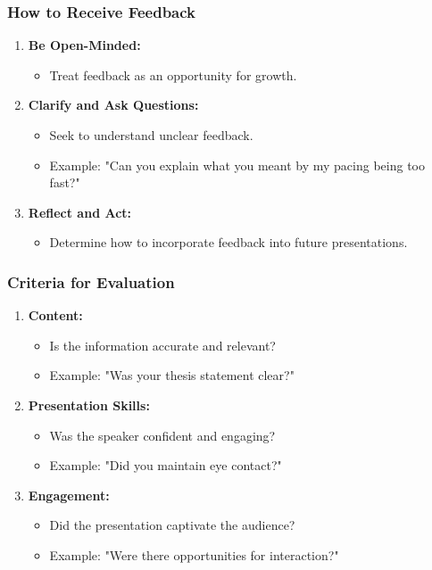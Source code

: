 \documentclass[aspectratio=169]{beamer}
\begin{document}
\begin{frame}[fragile]
  \frametitle{How to Receive Feedback}
  \begin{enumerate}
    \item \textbf{Be Open-Minded:} 
      \begin{itemize}
        \item Treat feedback as an opportunity for growth.
      \end{itemize}
    \item \textbf{Clarify and Ask Questions:} 
      \begin{itemize}
        \item Seek to understand unclear feedback.
        \item Example: "Can you explain what you meant by my pacing being too fast?"
      \end{itemize}
    \item \textbf{Reflect and Act:} 
      \begin{itemize}
        \item Determine how to incorporate feedback into future presentations.
      \end{itemize}
  \end{enumerate}
\end{frame}

\begin{frame}[fragile]
  \frametitle{Criteria for Evaluation}
  \begin{enumerate}
    \item \textbf{Content:}
      \begin{itemize}
        \item Is the information accurate and relevant?
        \item Example: "Was your thesis statement clear?"
      \end{itemize}
    \item \textbf{Presentation Skills:}
      \begin{itemize}
        \item Was the speaker confident and engaging?
        \item Example: "Did you maintain eye contact?"
      \end{itemize}
    \item \textbf{Engagement:}
      \begin{itemize}
        \item Did the presentation captivate the audience?
        \item Example: "Were there opportunities for interaction?"
      \end{itemize}
  \end{enumerate}
\end{frame}
\end{document}
